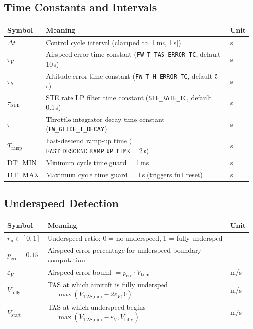 \documentclass[12pt,a4paper]{article}
\begin{document}
\subsection*{Time Constants and Intervals}
\begin{center}\begin{tabular}{lll}\toprule
Symbol & Meaning & Unit \\\midrule
$\Delta t$ & Control cycle interval (clamped to [1\,ms, 1\,s]) & s \\
$\tau_V$ & Airspeed error time constant (\texttt{FW\_T\_TAS\_ERROR\_TC}, default 10\,s) & s \\
$\tau_h$ & Altitude error time constant (\texttt{FW\_T\_H\_ERROR\_TC}, default 5\,s) & s \\
$\tau_{\text{STE}}$ & STE rate LP filter time constant (\texttt{STE\_RATE\_TC}, default 0.1\,s) & s \\
$\tau$ & Throttle integrator decay time constant (\texttt{FW\_GLIDE\_I\_DECAY}) & s \\
$T_{\text{ramp}}$ & Fast-descend ramp-up time ($\texttt{FAST\_DESCEND\_RAMP\_UP\_TIME} = 2$\,s) & s \\
DT\_MIN & Minimum cycle time guard = 1\,ms & s \\
DT\_MAX & Maximum cycle time guard = 1\,s (triggers full reset) & s \\
\bottomrule\end{tabular}\end{center}

\subsection*{Underspeed Detection}
\begin{center}\begin{tabular}{lll}\toprule
Symbol & Meaning & Unit \\\midrule
$r_u \in [0,1]$ & Underspeed ratio: 0 = no underspeed, 1 = fully undersped & --- \\
$p_{\text{err}} = 0.15$ & Airspeed error percentage for underspeed boundary computation & --- \\
$\varepsilon_V$ & Airspeed error bound $= p_{\text{err}}\cdot V_{\text{trim}}$ & m/s \\
$V_{\text{fully}}$ & TAS at which aircraft is fully undersped $= \max(V_{\text{TAS,min}}-2\varepsilon_V,0)$ & m/s \\
$V_{\text{start}}$ & TAS at which underspeed begins $= \max(V_{\text{TAS,min}}-\varepsilon_V,V_{\text{fully}})$ & m/s \\
\bottomrule\end{tabular}\end{center}
\end{document}
